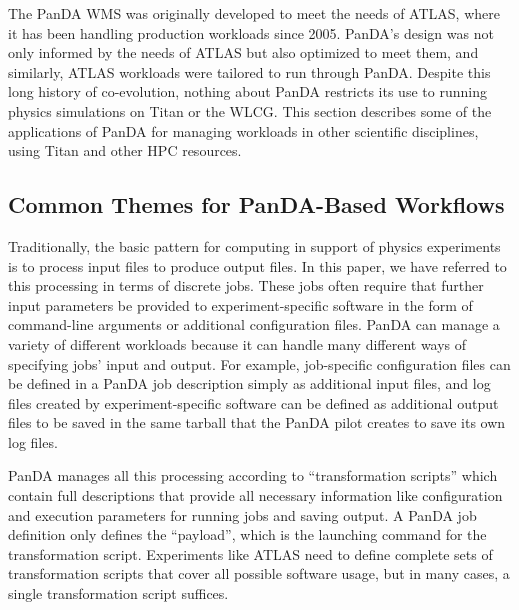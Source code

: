 
%
%

The PanDA WMS was originally developed to meet the needs of ATLAS, where it has
been handling production workloads since 2005. PanDA's design was not only
informed by the needs of ATLAS but also optimized to meet them, and similarly,
ATLAS workloads were tailored to run through PanDA. Despite this long history
of co-evolution, nothing about PanDA restricts its use to running physics
simulations on Titan or the WLCG. This section describes some of the
applications of PanDA for managing workloads in other scientific disciplines,
using Titan and other HPC resources.

\subsection{Common Themes for PanDA-Based Workflows}
\label{subsec:common-themes}


Traditionally, the basic pattern for computing in support of physics
experiments is to process input files to produce output files. In this paper,
we have referred to this processing in terms of discrete jobs. These jobs often
require that further input parameters be provided to experiment-specific
software in the form of command-line arguments or additional configuration
files. PanDA can manage a variety of different workloads because it can handle
many different ways of specifying jobs' input and output. For example,
job-specific configuration files can be defined in a PanDA job description
simply as additional input files, and log files created by experiment-specific
software can be defined as additional output files to be saved in the same
tarball that the PanDA pilot creates to save its own log files.


PanDA manages all this processing according to ``transformation scripts'' which
contain full descriptions that provide all necessary information like
configuration and execution parameters for running jobs and saving output. A
PanDA job definition only defines the ``payload'', which is the launching
command for the transformation script. Experiments like ATLAS need to define
complete sets of transformation scripts that cover all possible software usage,
but in many cases, a single transformation script suffices.

